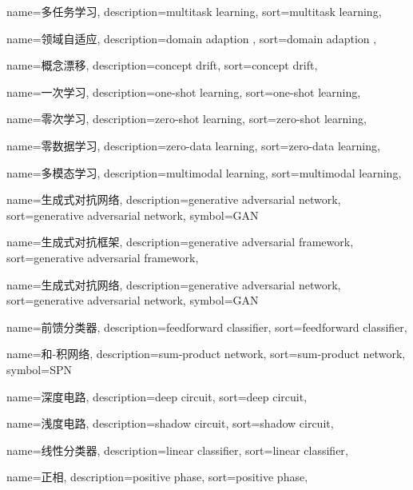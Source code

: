 {
  name=多任务学习,
  description={multitask learning},
  sort={multitask learning},
}

{
  name=领域自适应,
  description={domain adaption}  ,
  sort={domain adaption}  ,
}

{
  name=概念漂移,
  description={concept drift},
  sort={concept drift},
}

{
  name=一次学习,
  description={one-shot learning},
  sort={one-shot learning},
}

{
  name=零次学习,
  description={zero-shot learning},
  sort={zero-shot learning},
}

{
  name=零数据学习,
  description={zero-data learning},
  sort={zero-data learning},
}

{
  name=多模态学习,
  description={multimodal learning},
  sort={multimodal learning},
}

{
  name=生成式对抗网络,
  description={generative adversarial network},
  sort={generative adversarial network},
  symbol={GAN}
}

{
	name=生成式对抗框架,
	description={generative adversarial framework},
	sort={generative adversarial framework},
}

{
  name=生成式对抗网络,
  description={generative adversarial network},
  sort={generative adversarial network},
  symbol={GAN}
}

{
  name=前馈分类器,
  description={feedforward classifier},
  sort={feedforward classifier},
}

{
  name=和-积网络,
  description={sum-product network},
  sort={sum-product network},
  symbol={SPN}
}

{
  name=深度电路,
  description={deep circuit},
  sort={deep circuit},
}

{
  name=浅度电路,
  description={shadow circuit},
  sort={shadow circuit},
}

{
  name=线性分类器,
  description={linear classifier},
  sort={linear classifier},
}

{
  name=正相,
  description={positive phase},
  sort={positive phase},
}

